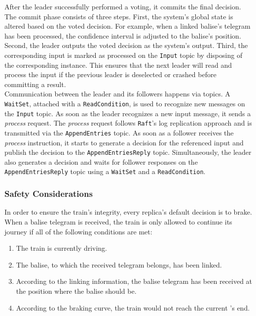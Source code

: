After the leader successfully performed a voting, it commits the final decision.
The commit phase consists of three steps.
First, the system's global state is altered based on the voted decision.
For example, when a linked balise's telegram has been processed, the confidence interval is adjusted to the balise's position.
Second, the leader outputs the voted decision as the system's output.
Third, the corresponding input is marked as processed on the \texttt{Input} topic by disposing of the corresponding  instance.
This ensures that the next leader will read and process the input if the previous leader is deselected or crashed before committing a result.
\\

Communication between the leader and its followers happens via  topics.
A \texttt{WaitSet}, attached with a \texttt{ReadCondition}, is used to recognize new messages on the \texttt{Input} topic.
As soon as the leader recognizes a new input message, it sends a \textit{process} request.
The \textit{process} request follows \texttt{Raft}'s log replication approach and is transmitted via the \texttt{AppendEntries} topic.
As soon as a follower receives the \textit{process} instruction, it starts to generate a decision for the referenced input and publish the decision to the \texttt{AppendEntriesReply} topic.
Simultaneously, the leader also generates a decision and waits for follower responses on the \texttt{AppendEntriesReply} topic using a \texttt{WaitSet} and a \texttt{ReadCondition}.

\subsubsection{Safety Considerations}

In order to ensure the train's integrity, every replica's default decision is to brake.
When a balise telegram is received, the train is only allowed to continue its journey if all of the following conditions are met:

\begin{enumerate}
\item The train is currently driving.
\item The balise, to which the received telegram belongs, has been linked.
\item According to the linking information, the balise telegram has been received at the position where the balise should be.
\item According to the braking curve, the train would not reach the current 's end.
\end{enumerate}

